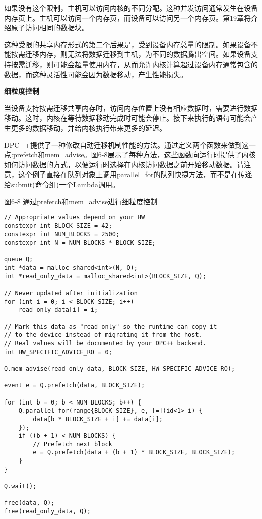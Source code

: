 如果没有这个限制，主机可以访问内核的不同分配。这种并发访问通常发生在设备内存页上。主机可以访问一个内存页，而设备可以访问另一个内存页。第19章将介绍原子访问相同的数据块。\par

这种受限的共享内存形式的第二个后果是，受到设备内存总量的限制。如果设备不能按需迁移内存，则无法将数据迁移到主机，为不同的数据腾出空间。如果设备支持按需迁移，则可能会超量使用内存，从而允许内核计算超过设备内存通常包含的数据，而这种灵活性可能会因为数据移动，产生性能损失。\par

\hspace*{\fill} \par %
\textbf{细粒度控制}

当设备支持按需迁移共享内存时，访问内存位置上没有相应数据时，需要进行数据移动。这时，内核在等待数据移动完成时可能会停止。接下来执行的语句可能会产生更多的数据移动，并给内核执行带来更多的延迟。\par

DPC++提供了一种修改自动迁移机制性能的方法。通过定义两个函数来做到这一点:prefetch和mem\_advise。图6-8展示了每种方法，这些函数向运行时提供了内核如何访问数据的方式，以便运行时选择在内核访问数据之前开始移动数据。请注意，这个例子直接在队列对象上调用parallel\_for的队列快捷方法，而不是在传递给submit(命令组)一个Lambda调用。\par

\hspace*{\fill} \par %
图6-8 通过prefetch和mem\_advise进行细粒度控制
\begin{lstlisting}[caption={}]
// Appropriate values depend on your HW
constexpr int BLOCK_SIZE = 42;
constexpr int NUM_BLOCKS = 2500;
constexpr int N = NUM_BLOCKS * BLOCK_SIZE;

queue Q;
int *data = malloc_shared<int>(N, Q);
int *read_only_data = malloc_shared<int>(BLOCK_SIZE, Q);

// Never updated after initialization
for (int i = 0; i < BLOCK_SIZE; i++)
	read_only_data[i] = i;
	
// Mark this data as "read only" so the runtime can copy it
// to the device instead of migrating it from the host.
// Real values will be documented by your DPC++ backend.
int HW_SPECIFIC_ADVICE_RO = 0;

Q.mem_advise(read_only_data, BLOCK_SIZE, HW_SPECIFIC_ADVICE_RO);

event e = Q.prefetch(data, BLOCK_SIZE);

for (int b = 0; b < NUM_BLOCKS; b++) {
	Q.parallel_for(range{BLOCK_SIZE}, e, [=](id<1> i) {
		data[b * BLOCK_SIZE + i] += data[i];
	});
	if ((b + 1) < NUM_BLOCKS) {
		// Prefetch next block
		e = Q.prefetch(data + (b + 1) * BLOCK_SIZE, BLOCK_SIZE);
	}
}

Q.wait();

free(data, Q);
free(read_only_data, Q);
\end{lstlisting}

